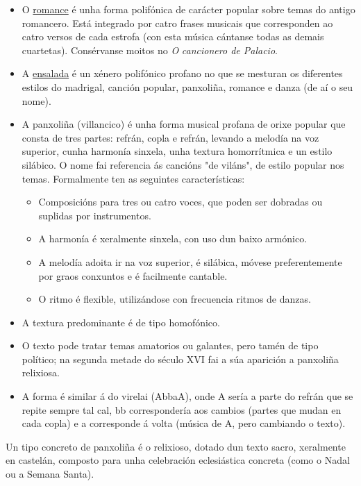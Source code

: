 \documentclass[
]{article}
\begin{document}
\begin{itemize}
\item
  O \href{http://open.spotify.com/track/6ltOfn1evFQ2ZtXesbKAEM}{romance}
  é unha forma polifónica de carácter popular sobre temas do antigo
  romancero. Está integrado por catro frases musicais que corresponden
  ao catro versos de cada estrofa (con esta música cántanse todas as
  demais cuartetas). Consérvanse moitos no \emph{O} \emph{cancionero de
  Palacio}.
\item
  A
  \href{http://open.spotify.com/track/4dLxTrRRCpqV59G9S2GqvC}{ensalada}
  é un xénero polifónico profano no que se mesturan os diferentes
  estilos do madrigal, canción popular, panxoliña, romance e danza (de
  aí o seu nome).
\item
  A panxoliña (villancico) é unha forma musical profana de orixe popular
  que consta de tres partes: refrán, copla e refrán, levando a melodía
  na voz superior, cunha harmonía sinxela, unha textura homorrítmica e
  un estilo silábico. O nome fai referencia ás cancións "de viláns", de
  estilo popular nos temas. Formalmente ten as seguintes
  características:

  \begin{itemize}
  \item
    Composicións para tres ou catro voces, que poden ser dobradas ou
    suplidas por instrumentos.
  \item
    A harmonía é xeralmente sinxela, con uso dun baixo armónico.
  \item
    A melodía adoita ir na voz superior, é silábica, móvese
    preferentemente por graos conxuntos e é facilmente cantable.
  \item
    O ritmo é flexible, utilizándose con frecuencia ritmos de danzas.
  \end{itemize}
\item
  A textura predominante é de tipo homofónico.
\item
  O texto pode tratar temas amatorios ou galantes, pero tamén de tipo
  político; na segunda metade do século XVI fai a súa aparición a
  panxoliña relixiosa.
\item
  A forma é similar á do virelai (AbbaA), onde A sería a parte do refrán
  que se repite sempre tal cal, bb correspondería aos cambios (partes
  que mudan en cada copla) e a corresponde á volta (música de A, pero
  cambiando o texto).
\end{itemize}

Un tipo concreto de panxoliña é o relixioso, dotado dun texto sacro,
xeralmente en castelán, composto para unha celebración eclesiástica
concreta (como o Nadal ou a Semana Santa).
\end{document}
